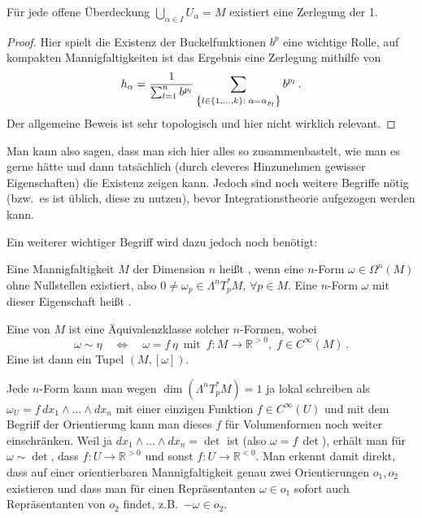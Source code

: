 \documentclass[../H_Analysis_main.tex]{subfiles}
\begin{document}
\begin{satz}
Für jede offene Überdeckung $\displaystyle \bigcup_{\alpha \in I} U_\alpha = M$ existiert eine Zerlegung der 1.
\end{satz}
\begin{proof}
Hier spielt die Existenz der Buckelfunktionen $b^p$ eine wichtige Rolle, auf kompakten Mannigfaltigkeiten ist das Ergebnis eine Zerlegung mithilfe von
\begin{equation*}
h_\alpha = \frac{1}{\sum_{l = 1}^n b^{p_l}} \sum_{\qty{l \in \qty{1, \dots, k}: \; \alpha = \alpha_{p_l}}} b^{p_l} \, .
\end{equation*}
Der allgemeine Beweis ist sehr topologisch und hier nicht wirklich relevant.
\end{proof}

Man kann also sagen, dass man sich hier alles so zusammenbastelt, wie man es gerne hätte und dann tatsächlich (durch cleveres Hinzunehmen gewisser Eigenschaften) die Existenz zeigen kann. Jedoch sind noch weitere Begriffe nötig (bzw.~es ist üblich, diese zu nutzen), bevor Integrationstheorie aufgezogen werden kann.

Ein weiterer wichtiger Begriff wird dazu jedoch noch benötigt:
\begin{defi}[Orientierbarkeit]
Eine Mannigfaltigkeit $M$ der Dimension $n$ heißt , wenn eine $n$-Form $\omega \in \Omega^n(M)$ ohne Nullstellen existiert, also $0 \neq \omega_p \in \Lambda^n T_p^* M, \, \forall p \in M$. Eine $n$-Form $\omega$ mit dieser Eigenschaft heißt .

Eine  von $M$ ist eine Äquivalenzklasse solcher $n$-Formen, wobei
\begin{equation}
\omega \sim \eta \quad \Leftrightarrow \quad \omega = f \, \eta \, \text{ mit } \, f: M \rightarrow \mathbb{R}^{> 0}, \; f \in C^\infty(M) \, .
\end{equation}
Eine  ist dann ein Tupel $(M, [\omega])$.
\end{defi}
Jede $n$-Form kann man wegen $\dim(\Lambda^n T_p^* M) = 1$ ja lokal schreiben als $\omega_U = f \, dx_1 \wedge \dots \wedge dx_n$ mit einer einzigen Funktion $f \in C^\infty(U)$ und mit dem Begriff der Orientierung kann man dieses $f$ für Volumenformen noch weiter einschränken. Weil ja $dx_1 \wedge \dots \wedge dx_n = \det$ ist (also $\omega = f \, \det$), erhält man für $\omega \sim \det$, dass $f: U \rightarrow \mathbb{R}^{> 0}$ und sonst $f: U \rightarrow \mathbb{R}^{< 0}$. Man erkennt damit direkt, dass auf einer orientierbaren Mannigfaltigkeit genau zwei Orientierungen $o_1, o_2$ existieren und dass man für einen Repräsentanten $\omega \in o_1$ sofort auch Repräsentanten von $o_2$ findet, z.B.~$-\omega \in o_2$.
\end{document}
